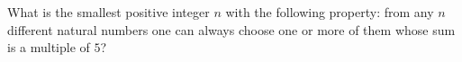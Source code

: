 What is the smallest positive integer $n$ with the following property: from any $n$ different natural numbers one can always choose one or more of them whose sum is a multiple of $5$?
